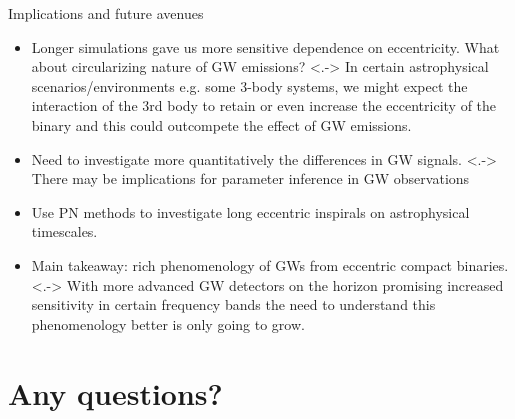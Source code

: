 \documentclass[smaller,aspectratio=169]{beamer}
\begin{document}
\begin{frame}{Implications and future avenues}
    \begin{itemize}
        \item<+->
            Longer simulations gave us more sensitive dependence on 
            eccentricity. What about circularizing nature of GW emissions?
        \note[item]<.->{
            In certain astrophysical scenarios/environments e.g. some 3-body 
            systems, we might expect the interaction of the 3rd body to retain 
            or even increase the eccentricity of the binary and this could
            outcompete the effect of GW emissions.}
        \item<+->
            Need to investigate more quantitatively the differences in GW 
            signals.
        \note[item]<.->{
            There may be implications for parameter inference in GW 
            observations}
        \item<+->
            Use PN methods to investigate long eccentric inspirals on 
            astrophysical timescales.
        \item<+->
            Main takeaway: rich phenomenology of GWs from eccentric compact 
            binaries.
        \note[item]<.->{
            With more advanced GW detectors on the horizon promising increased
            sensitivity in certain frequency bands the need to understand 
            this phenomenology better is only going to grow.}
    \end{itemize}
\end{frame}

\section*{Any questions?}
\end{document}
